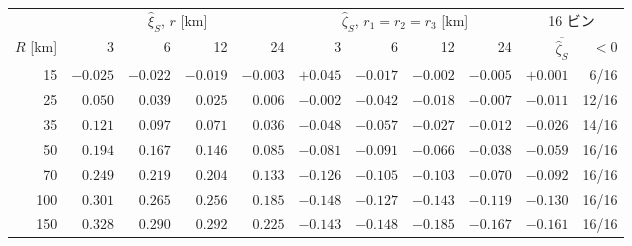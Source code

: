 \begin{tabular}{rrrrrrrrrrr}
\toprule
& \multicolumn{4}{c}{$\hat\xi_S$, $r$ [km]} & \multicolumn{4}{c}{$\hat\zeta_S$, $r_1 = r_2 = r_3$ [km]} & \multicolumn{2}{c}{16 ビン} \\
$R$ [km] & 3 & 6 & 12 & 24 & 3 & 6 & 12 & 24 & $\overline{\hat\zeta_S}$ & $< 0$ \\
\midrule
15 & $-0.025$ & $-0.022$ & $-0.019$ & $-0.003$ & $+0.045$ & $-0.017$ & $-0.002$ & $-0.005$ & $+0.001$ & 6/16 \\
25 & $0.050$ & $0.039$ & $0.025$ & $0.006$ & $-0.002$ & $-0.042$ & $-0.018$ & $-0.007$ & $-0.011$ & 12/16 \\
35 & $0.121$ & $0.097$ & $0.071$ & $0.036$ & $-0.048$ & $-0.057$ & $-0.027$ & $-0.012$ & $-0.026$ & 14/16 \\
50 & $0.194$ & $0.167$ & $0.146$ & $0.085$ & $-0.081$ & $-0.091$ & $-0.066$ & $-0.038$ & $-0.059$ & 16/16 \\
70 & $0.249$ & $0.219$ & $0.204$ & $0.133$ & $-0.126$ & $-0.105$ & $-0.103$ & $-0.070$ & $-0.092$ & 16/16 \\
100 & $0.301$ & $0.265$ & $0.256$ & $0.185$ & $-0.148$ & $-0.127$ & $-0.143$ & $-0.119$ & $-0.130$ & 16/16 \\
150 & $0.328$ & $0.290$ & $0.292$ & $0.225$ & $-0.143$ & $-0.148$ & $-0.185$ & $-0.167$ & $-0.161$ & 16/16 \\
\bottomrule
\end{tabular}
